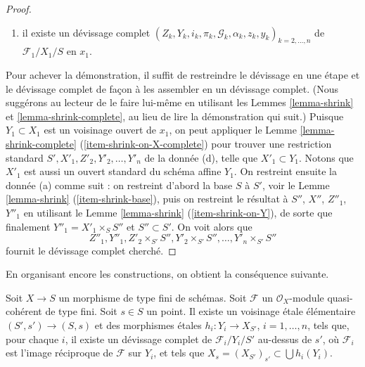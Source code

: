 \begin{proof}
\begin{enumerate}
\item[(d)] il existe un d\'evissage complet
$(Z_k, Y_k, i_k, \pi_k, \mathcal{G}_k, \alpha_k, z_k, y_k)_{k = 2, \ldots, n}$
de $\mathcal{F}_1/X_1/S$ en $x_1$.
\end{enumerate}
Pour achever la démonstration, il suffit de restreindre le d\'evissage en une étape
et le d\'evissage complet de façon à les assembler en un
d\'evissage complet. (Nous suggérons au lecteur de le faire lui-même en utilisant
les Lemmes \ref{lemma-shrink} et
\ref{lemma-shrink-complete},
au lieu de lire la démonstration qui suit.) Puisque $Y_1 \subset X_1$
est un voisinage ouvert de $x_1$, on peut appliquer
le Lemme \ref{lemma-shrink-complete} (\ref{item-shrink-on-X-complete})
pour trouver une restriction standard $S', X'_1, Z'_2, Y'_2, \ldots, Y'_n$
de la donnée (d), telle que $X'_1 \subset Y_1$. Notons que $X'_1$ est aussi
un ouvert standard du schéma affine $Y_1$. On restreint ensuite la donnée
(a) comme suit : on restreint d'abord la base $S$ à $S'$, voir
le Lemme \ref{lemma-shrink} (\ref{item-shrink-base}), puis
on restreint le résultat à $S''$, $X''$, $Z''_1$, $Y''_1$ en utilisant
le Lemme \ref{lemma-shrink} (\ref{item-shrink-on-Y}),
de sorte que finalement $Y''_1 = X'_1 \times_S S''$ et $S'' \subset S'$.
On voit alors que
$$
Z''_1, Y''_1, Z'_2 \times_{S'} S'', Y'_2 \times_{S'} S'', \ldots,
Y'_n \times_{S'} S''
$$
fournit le d\'evissage complet cherché.
\end{proof}

\noindent
En organisant encore les constructions, on obtient la conséquence suivante.

\begin{lemma}
\label{lemma-existence-complete}
Soit $X \to S$ un morphisme de type fini de schémas.
Soit $\mathcal{F}$ un $\mathcal{O}_X$-module quasi-cohérent de type fini.
Soit $s \in S$ un point.
Il existe un voisinage \'etale élémentaire
$(S', s') \to (S, s)$ et des morphismes \'etales
$h_i : Y_i \to X_{S'}$, $i = 1, \ldots, n$, tels que, pour chaque
$i$, il existe un d\'evissage complet de $\mathcal{F}_i/Y_i/S'$ au-dessus de $s'$,
où $\mathcal{F}_i$ est l'image réciproque de $\mathcal{F}$ sur $Y_i$,
et tels que $X_s = (X_{S'})_{s'} \subset \bigcup h_i(Y_i)$.
\end{lemma}

